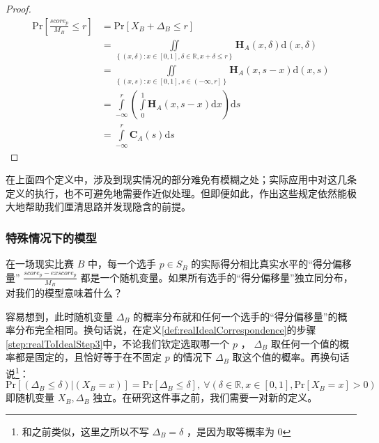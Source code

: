             \begin{proof}
                \begin{align*}
                    \mathrm{Pr}\left[\frac{\textit{score}_p}{M_B}\leq r\right]
                    &=\mathrm{Pr}\left[X_B+\Delta_B\leq r\right] \\
                    &=\iint\limits_{\left\{(x,\delta):x\in\left[0,1\right],\delta\in\mathbb{R},x+\delta\leq r\right\}}\bm{H}_A(x,\delta)\mathrm{d}(x,\delta) \\
                    &=\iint\limits_{\left\{(x,s):x\in\left[0,1\right],s\in\left(-\infty,r\right]\right\}}\bm{H}_A(x,s-x)\mathrm{d}(x,s) \\
                    &=\int\limits_{-\infty}^r\left(\int\limits_0^1 \bm{H}_A(x,s-x)\mathrm{d}x\right)\mathrm{d}s \\
                    &=\int\limits_{-\infty}^r \bm{C}_A(s)\mathrm{d}s
                \end{align*}
            \end{proof}

            在上面四个定义中，涉及到现实情况的部分难免有模糊之处；实际应用中对这几条定义的执行，也不可避免地需要作近似处理。但即便如此，作出这些规定依然能极大地帮助我们厘清思路并发现隐含的前提。

        \subsubsection{特殊情况下的模型}

            在一场现实比赛 $B$ 中，每一个选手 $p\in S_B$ 的实际得分相比真实水平的“得分偏移量” $\frac{\textit{score}_p-\textit{exscore}_p}{M_B}$ 都是一个随机变量。如果所有选手的“得分偏移量”独立同分布，对我们的模型意味着什么？

            容易想到，此时随机变量 $\Delta_B$ 的概率分布就和任何一个选手的“得分偏移量”的概率分布完全相同。换句话说，在定义\ref{def:realIdealCorrespondence}的步骤\ref{step:realToIdealStep3}中，不论我们钦定选取哪一个 $p$ ， $\Delta_B$ 取任何一个值的概率都是固定的，且恰好等于在不固定 $p$ 的情况下 $\Delta_B$ 取这个值的概率。再换句话说\footnote{和之前类似，这里之所以不写 $\Delta_B=\delta$ ，是因为取等概率为 $0$ }：$$\mathrm{Pr}\left[(\Delta_B\leq\delta)|(X_B=x)\right]=\mathrm{Pr}\left[\Delta_B\leq\delta\right],\ \forall \left(\delta\in\mathbb{R},x\in\left[0,1\right],\mathrm{Pr}\left[X_B=x\right]>0\right)$$即随机变量 $X_B,\Delta_B$ 独立。在研究这件事之前，我们需要一对新的定义。

